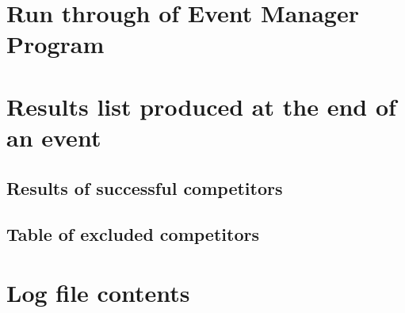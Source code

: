 \documentclass[a4paper,12pt]{article}
\begin{document}
\begin{landscape}
\section{Run through of Event Manager Program}


\section{Results list produced at the end of an event}

\subsection{Results of successful competitors}


\subsection{Table of excluded competitors}


\section{Log file contents}


\end{landscape}
\end{document}

